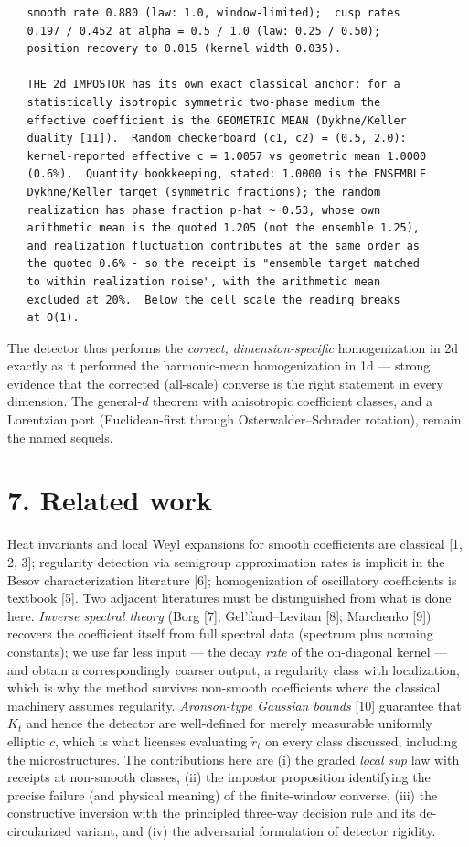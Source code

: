 \documentclass[11pt]{article}
\begin{document}
\begin{small}\begin{verbatim}
   smooth rate 0.880 (law: 1.0, window-limited);  cusp rates
   0.197 / 0.452 at alpha = 0.5 / 1.0 (law: 0.25 / 0.50);
   position recovery to 0.015 (kernel width 0.035).

   THE 2d IMPOSTOR has its own exact classical anchor: for a
   statistically isotropic symmetric two-phase medium the
   effective coefficient is the GEOMETRIC MEAN (Dykhne/Keller
   duality [11]).  Random checkerboard (c1, c2) = (0.5, 2.0):
   kernel-reported effective c = 1.0057 vs geometric mean 1.0000
   (0.6%).  Quantity bookkeeping, stated: 1.0000 is the ENSEMBLE
   Dykhne/Keller target (symmetric fractions); the random
   realization has phase fraction p-hat ~ 0.53, whose own
   arithmetic mean is the quoted 1.205 (not the ensemble 1.25),
   and realization fluctuation contributes at the same order as
   the quoted 0.6% - so the receipt is "ensemble target matched
   to within realization noise", with the arithmetic mean
   excluded at 20%.  Below the cell scale the reading breaks
   at O(1).
\end{verbatim}\end{small}
The detector thus performs the \emph{correct, dimension-specific} homogenization in 2d exactly as it performed the harmonic-mean homogenization in 1d — strong evidence that the corrected (all-scale) converse is the right statement in every dimension. The general-$d$ theorem with anisotropic coefficient classes, and a Lorentzian port (Euclidean-first through Osterwalder–Schrader rotation), remain the named sequels.

\section*{7. Related work}
Heat invariants and local Weyl expansions for smooth coefficients are classical [1, 2, 3]; regularity detection via semigroup approximation rates is implicit in the Besov characterization literature [6]; homogenization of oscillatory coefficients is textbook [5].  Two adjacent literatures must be distinguished from what is done here. \emph{Inverse spectral theory} (Borg [7]; Gel'fand–Levitan [8]; Marchenko [9]) recovers the coefficient itself from full spectral data (spectrum plus norming constants); we use far less input — the decay \emph{rate} of the on-diagonal kernel — and obtain a correspondingly coarser output, a regularity class with localization, which is why the method survives non-smooth coefficients where the classical machinery assumes regularity.  \emph{Aronson-type Gaussian bounds} [10] guarantee that $K_t$ and hence the detector are well-defined for merely measurable uniformly elliptic $c$, which is what licenses evaluating $\tilde r_t$ on every class discussed, including the microstructures.  The contributions here are (i) the graded \emph{local sup} law with receipts at non-smooth classes, (ii) the impostor proposition identifying the precise failure (and physical meaning) of the finite-window converse, (iii) the constructive inversion with the principled three-way decision rule and its de-circularized variant, and (iv) the adversarial formulation of detector rigidity.
\end{document}
